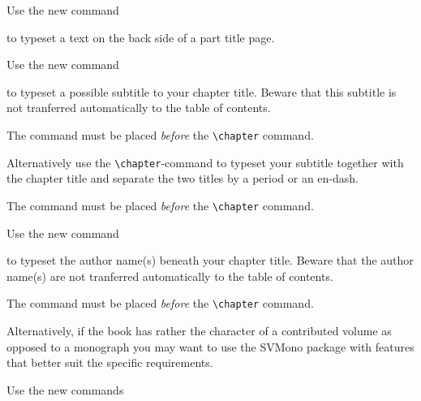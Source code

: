 \documentclass[graybox,square]{svmono}
\begin{document}
\begin{sloppy}
Use the new command

\cprotect{}

to typeset a text on the back side of a part title page.

Use the new command

\cprotect{}

to typeset a possible subtitle to your chapter title. Beware that this subtitle is not tranferred automatically to the table of contents.

The command must be placed {\it before} the \verb|\chapter| command.

Alternatively use the \verb|\chapter|-command to typeset your subtitle together with the chapter title and separate the two titles by a period or an en-dash. 

The command must be placed {\it before} the \verb|\chapter| command.

\pagebreak

Use the new command

\cprotect{}

to typeset the author name(s) beneath your chapter title. Beware that the author name(s) are not tranferred automatically to the table of contents.

The command must be placed {\it before} the \verb|\chapter| command.

Alternatively, if the book has rather the character of a contributed volume as opposed to a monograph you may want to use the {\sc SVMono} package with features that better suit the specific requirements.  

Use the new commands

\cprotect{}


\end{sloppy}
\end{document}
